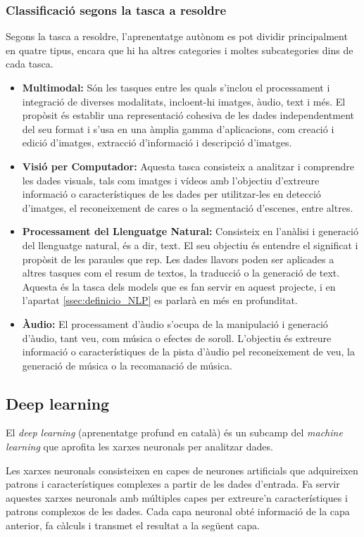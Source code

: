 \subsubsection{Classificació segons la tasca a resoldre}
Segons la tasca a resoldre, l'aprenentatge autònom es pot dividir principalment en quatre tipus, encara que hi ha altres categories i moltes subcategories dins de cada tasca. 
\begin{itemize}
    \item \textbf{Multimodal:} Són les tasques entre les quals s'inclou el processament i integració de diverses modalitats, incloent-hi imatges, àudio, text i més. El propòsit és establir una representació cohesiva de les dades independentment del seu format i s'usa en una àmplia gamma d'aplicacions, com creació i edició d'imatges, extracció d'informació i descripció d'imatges.
    \item \textbf{Visió per Computador:} Aquesta tasca consisteix a analitzar i comprendre les dades visuals, tals com imatges i vídeos amb l'objectiu d'extreure informació o característiques de les dades per utilitzar-les en detecció d'imatges, el reconeixement de cares o la segmentació d'escenes, entre altres.
    \item \textbf{Processament del Llenguatge Natural:} Consisteix en l'anàlisi i generació del llenguatge natural, és a dir, text. El seu objectiu és entendre el significat i propòsit de les paraules que rep. Les dades llavors poden ser aplicades a altres tasques com el resum de textos, la traducció o la generació de text. Aquesta és la tasca dels models que es fan servir en aquest projecte, i en l'apartat \ref{ssec:definicio_NLP} es parlarà en més en profunditat.
    \item \textbf{Àudio:} El processament d'àudio s'ocupa de la manipulació i generació d'àudio, tant veu, com música o efectes de soroll. L'objectiu és extreure informació o característiques de la pista d'àudio pel reconeixement de veu, la generació de música o la recomanació de música. 
\end{itemize}

\subsection{Deep learning}
El \textit{deep learning} (aprenentatge profund en català) és un subcamp del \textit{machine learning} que aprofita les xarxes neuronals per analitzar dades. 

Les xarxes neuronals consisteixen en capes de neurones artificials que adquireixen patrons i característiques complexes a partir de les dades d'entrada. Fa servir aquestes xarxes neuronals amb múltiples capes per extreure'n característiques i patrons complexos de les dades. Cada capa neuronal obté informació de la capa anterior, fa càlculs i transmet el resultat a la següent capa. 

